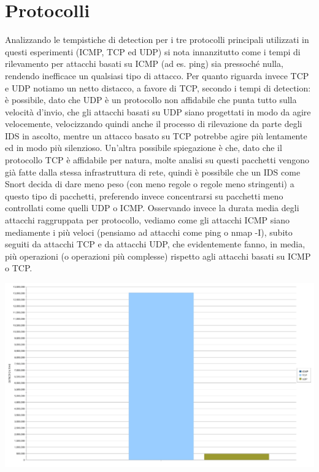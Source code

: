 \section{Protocolli}

Analizzando le tempistiche di detection per i tre protocolli principali utilizzati in questi esperimenti (ICMP, TCP ed UDP) si nota innanzitutto come i tempi di rilevamento per attacchi basati su ICMP (ad es. ping) sia pressoché nulla, rendendo inefficace un qualsiasi tipo di attacco. Per quanto riguarda invece TCP e UDP notiamo un netto distacco, a favore di TCP, secondo i tempi di detection: è possibile, dato che UDP è un protocollo non affidabile che punta tutto sulla velocità d'invio, che gli attacchi basati su UDP siano progettati in modo da agire velocemente, velocizzando quindi anche il processo di rilevazione da parte degli IDS in ascolto, mentre un attacco basato su TCP potrebbe agire più lentamente ed in modo più silenzioso. Un'altra possibile spiegazione è che, dato che il protocollo TCP è affidabile per natura, molte analisi su questi pacchetti vengono già fatte dalla stessa infrastruttura di rete, quindi è possibile che un IDS come Snort decida di dare meno peso (con meno regole o regole meno stringenti) a questo tipo di pacchetti, preferendo invece concentrarsi su pacchetti meno controllati come quelli UDP o ICMP. Osservando invece la durata media degli attacchi raggruppata per protocollo, vediamo come gli attacchi ICMP siano mediamente i più veloci (pensiamo ad attacchi come ping o nmap -I), subito seguiti da attacchi TCP e da attacchi UDP, che evidentemente fanno, in media, più operazioni (o operazioni più complesse) rispetto agli attacchi basati su ICMP o TCP.

\includegraphics[scale=0.3]{figure/detection_protocol.jpg}\\

